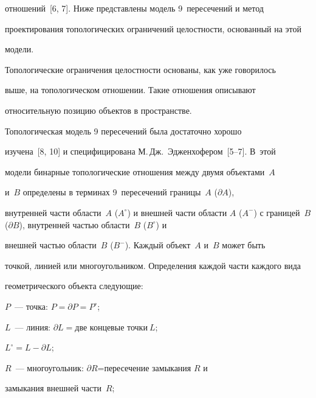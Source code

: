 отношений~[6, 7]. Ниже представлены модель 9~пересечений и метод 


проектирования топологических ограничений целостности, основанный на этой 


модели. 


    


    Топологические ограничения целостности основаны, как уже говорилось 


выше, на топологическом отношении. Такие отношения описывают 


относительную позицию объектов в пространстве. 


    


    Топологическая модель 9 пересечений была достаточно хорошо 


изучена~[8, 10] и специфицирована М.\,Дж.~Эдженхофером~[5--7]. В~этой 


модели бинарные топологические отношения между двумя объектами~$A$ 


и~$B$ определены в терминах 9~пересечений  границы~$A$ ($\partial A$), 


внутренней части области~$A$ ($A^\circ$) и внешней части области $A$ ($A^-


$) с границей~$B$ ($\partial B$), внутренней частью области~$B$ ($B^\circ$) и 


внешней частью области~$B$ ($B^-$). Каждый объект~$A$ и~$B$ может быть 


точкой, линией или многоугольником. Определения каждой части каждого вида 


геометрического объекта следующие: 


    


$P$~--- точка: $P=\partial P =P^\circ$;





$L$~--- линия: $\partial L = \mbox{две\ концевые\ точки}\ L$;





$L^\circ = L - \partial L$;





$R$~--- многоугольник: $\partial R$\;=\;пересечение замыкания $R$ и 


замыкания внешней части~$R$;





